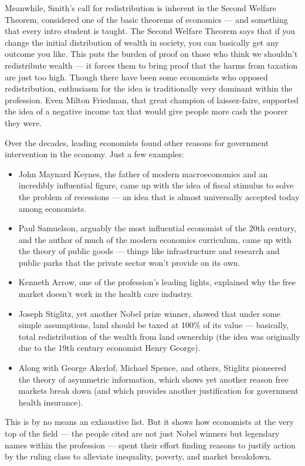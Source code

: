 \documentclass[
]{book}
\begin{document}
Meanwhile, Smith's call for redistribution is inherent in the Second Welfare Theorem, considered one of the basic theorems of economics --- and something that every intro student is taught. The Second Welfare Theorem says that if you change the initial distribution of wealth in society, you can basically get any outcome you like. This puts the burden of proof on those who think we shouldn't redistribute wealth --- it forces them to bring proof that the harms from taxation are just too high. Though there have been some economists who opposed redistribution, enthusiasm for the idea is traditionally very dominant within the profession. Even Milton Friedman, that great champion of laissez-faire, supported the idea of a negative income tax that would give people more cash the poorer they were.

Over the decades, leading economists found other reasons for government intervention in the economy. Just a few examples:

\begin{itemize}
\item
  John Maynard Keynes, the father of modern macroeconomics and an incredibly influential figure, came up with the idea of fiscal stimulus to solve the problem of recessions --- an idea that is almost universally accepted today among economists.
\item
  Paul Samuelson, arguably the most influential economist of the 20th century, and the author of much of the modern economics curriculum, came up with the theory of public goods --- things like infrastructure and research and public parks that the private sector won't provide on its own.
\item
  Kenneth Arrow, one of the profession's leading lights, explained why the free market doesn't work in the health care industry.
\item
  Joseph Stiglitz, yet another Nobel prize winner, showed that under some simple assumptions, land should be taxed at 100\% of its value --- basically, total redistribution of the wealth from land ownership (the idea was originally due to the 19th century economist Henry George).
\item
  Along with George Akerlof, Michael Spence, and others, Stiglitz pioneered the theory of asymmetric information, which shows yet another reason free markets break down (and which provides another justification for government health insurance).
\end{itemize}

This is by no means an exhaustive list. But it shows how economists at the very top of the field --- the people cited are not just Nobel winners but legendary names within the profession --- spent their effort finding reasons to justify action by the ruling class to alleviate inequality, poverty, and market breakdown.
\end{document}
